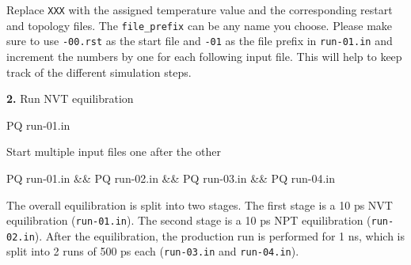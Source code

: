 \documentclass[
  letterpaper,
]{article}
\newenvironment{Shaded}{\begin{snugshade}}{\end{snugshade}}
\newcommand{\ExtensionTok}[1]{\textcolor[rgb]{0.00,0.23,0.31}{#1}}
\newcommand{\KeywordTok}[1]{\textcolor[rgb]{0.00,0.23,0.31}{#1}}
\newcommand{\NormalTok}[1]{\textcolor[rgb]{0.00,0.23,0.31}{#1}}
\begin{document}
\begin{tcolorbox}[enhanced jigsaw, toptitle=1mm, opacitybacktitle=0.6, colframe=quarto-callout-note-color-frame, toprule=.15mm, breakable, bottomrule=.15mm, left=2mm, title=\textcolor{quarto-callout-note-color}{\faInfo}\hspace{0.5em}{Note}, titlerule=0mm, leftrule=.75mm, bottomtitle=1mm, coltitle=black, arc=.35mm, rightrule=.15mm, opacityback=0, colback=white, colbacktitle=quarto-callout-note-color!10!white]

Replace \texttt{XXX} with the assigned temperature value and the
corresponding restart and topology files. The \texttt{file\_prefix} can
be any name you choose. Please make sure to use \texttt{-00.rst} as the
start file and \texttt{-01} as the file prefix in \texttt{run-01.in} and
increment the numbers by one for each following input file. This will
help to keep track of the different simulation steps.

\end{tcolorbox}

\textbf{2.} Run NVT equilibration

\begin{Shaded}
\begin{Highlighting}[]
\ExtensionTok{PQ}\NormalTok{ run{-}01.in}
\end{Highlighting}
\end{Shaded}

Start multiple input files one after the other

\begin{Shaded}
\begin{Highlighting}[]
\ExtensionTok{PQ}\NormalTok{ run{-}01.in }\KeywordTok{\&\&} \ExtensionTok{PQ}\NormalTok{ run{-}02.in }\KeywordTok{\&\&} \ExtensionTok{PQ}\NormalTok{ run{-}03.in }\KeywordTok{\&\&} \ExtensionTok{PQ}\NormalTok{ run{-}04.in}
\end{Highlighting}
\end{Shaded}

\begin{tcolorbox}[enhanced jigsaw, toptitle=1mm, opacitybacktitle=0.6, colframe=quarto-callout-important-color-frame, toprule=.15mm, breakable, bottomrule=.15mm, left=2mm, title=\textcolor{quarto-callout-important-color}{\faExclamation}\hspace{0.5em}{Important}, titlerule=0mm, leftrule=.75mm, bottomtitle=1mm, coltitle=black, arc=.35mm, rightrule=.15mm, opacityback=0, colback=white, colbacktitle=quarto-callout-important-color!10!white]

The overall equilibration is split into two stages. The first stage is a
10 ps NVT equilibration (\texttt{run-01.in}). The second stage is a 10
ps NPT equilibration (\texttt{run-02.in}). After the equilibration, the
production run is performed for 1 ns, which is split into 2 runs of 500
ps each (\texttt{run-03.in} and \texttt{run-04.in}).

\end{tcolorbox}
\end{document}
